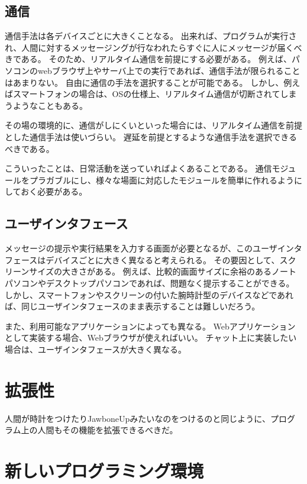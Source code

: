 \subsection{通信}\label{ux901aux4fe1}

通信手法は各デバイスごとに大きくことなる。
出来れば、プログラムが実行され、人間に対するメッセージングが行なわれたらすぐに人にメッセージが届くべきである。
そのため、リアルタイム通信を前提にする必要がある。
例えば、パソコンのwebブラウザ上やサーバ上での実行であれば、通信手法が限られることはあまりない。
自由に通信の手法を選択することが可能である。
しかし、例えばスマートフォンの場合は、OSの仕様上、リアルタイム通信が切断されてしまうようなこともある。

その場の環境的に、通信がしにくいといった場合には、リアルタイム通信を前提とした通信手法は使いづらい。
遅延を前提とするような通信手法を選択できるべきである。

こういったことは、日常活動を送っていればよくあることである。
通信モジュールをプラガブルにし、様々な場面に対応したモジュールを簡単に作れるようにしておく必要がある。

\subsection{ユーザインタフェース}\label{ux30e6ux30fcux30b6ux30a4ux30f3ux30bfux30d5ux30a7ux30fcux30b9}

メッセージの提示や実行結果を入力する画面が必要となるが、このユーザインタフェースはデバイスごとに大きく異なると考えられる。
その要因として、スクリーンサイズの大きさがある。
例えば、比較的画面サイズに余裕のあるノートパソコンやデスクトップパソコンであれば、問題なく提示することができる。
しかし、スマートフォンやスクリーンの付いた腕時計型のデバイスなどであれば、同じユーザインタフェースのまま表示することは難しいだろう。

また、利用可能なアプリケーションによっても異なる。
Webアプリケーションとして実装する場合、Webブラウザが使えればいい。
チャット上に実装したい場合は、ユーザインタフェースが大きく異なる。

\section{拡張性}\label{ux62e1ux5f35ux6027}

人間が時計をつけたりJawboneUpみたいなのをつけるのと同じように、プログラム上の人間もその機能を拡張できるべきだ。

\section{新しいプログラミング環境}\label{ux65b0ux3057ux3044ux30d7ux30edux30b0ux30e9ux30dfux30f3ux30b0ux74b0ux5883}

